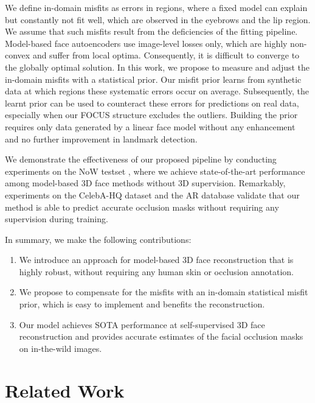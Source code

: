 \documentclass[10pt,twocolumn,letterpaper]{article}
\begin{document}
We define in-domain misfits as errors in regions, where a fixed model can explain but constantly not fit well, which are observed in the eyebrows and the lip region.
We assume that such misfits result from the deficiencies of the fitting pipeline.
Model-based face autoencoders use image-level losses only, which are highly non-convex and suffer from local optima.
Consequently, it is difficult to converge to the globally optimal solution.
In this work, we propose to measure and adjust the in-domain misfits with a statistical prior.
Our misfit prior learns from synthetic data at which regions these systematic errors occur on average.
Subsequently, the learnt prior can be used to counteract these errors for predictions on real data, especially when our FOCUS structure excludes the outliers.
Building the prior requires only data generated by a linear face model without any enhancement and no further improvement in landmark detection.



We demonstrate the effectiveness of our proposed pipeline by conducting experiments on the NoW testset \cite{Ringnet}, where we achieve state-of-the-art performance among model-based 3D face methods without 3D supervision.
Remarkably, experiments on the CelebA-HQ dataset \cite{CELEBAHQ} and the AR database \cite{ARdataset} validate that our method is able to predict accurate occlusion masks without requiring any supervision during training.

In summary, we make the following contributions:
\begin{enumerate}
\item We introduce an approach for model-based 3D face reconstruction that is highly robust, without requiring any human skin or occlusion annotation.
\item  We propose to compensate for the misfits with an in-domain statistical misfit prior, which is easy to implement and benefits the reconstruction.
\item  Our model achieves SOTA performance at self-supervised 3D face reconstruction and provides accurate estimates of the facial occlusion masks on in-the-wild images.
\end{enumerate}


\section{Related Work}
\end{document}
